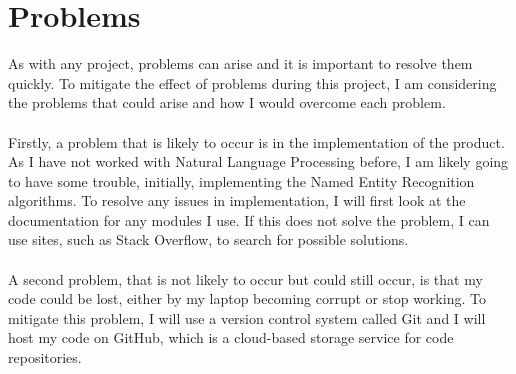 %
%

\section*{Problems}
As with any project, problems can arise and it is important to resolve them quickly. To mitigate the effect of problems during this project, I am considering the problems that could arise and how I would overcome each problem.\\\\
Firstly, a problem that is likely to occur is in the implementation of the product. As I have not worked with Natural Language Processing before, I am likely going to have some trouble, initially, implementing the Named Entity Recognition algorithms. To resolve any issues in implementation, I will first look at the documentation for any modules I use. If this does not solve the problem, I can use sites, such as Stack Overflow, to search for possible solutions.\\\\
A second problem, that is not likely to occur but could still occur, is that my code could be lost, either by my laptop becoming corrupt or stop working. To mitigate this problem, I will use a version control system called Git and I will host my code on GitHub, which is a cloud-based storage service for code repositories.


